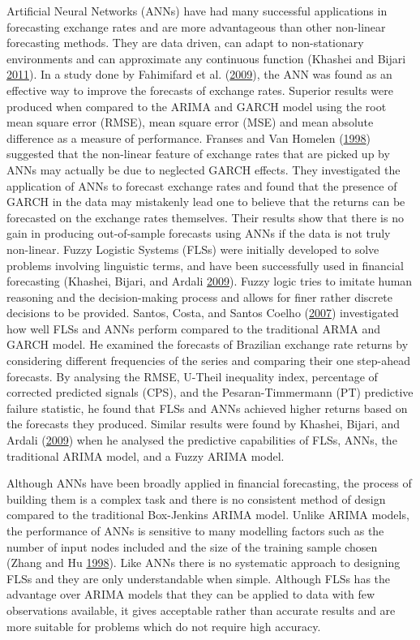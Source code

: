 \documentclass[12pt,preprint, authoryear]{elsarticle}
\numberwithin{equation}{section}
\numberwithin{figure}{section}
\numberwithin{table}{section}
\begin{document}
Artificial Neural Networks (ANNs) have had many successful applications
in forecasting exchange rates and are more advantageous than other
non-linear forecasting methods. They are data driven, can adapt to
non-stationary environments and can approximate any continuous function
(Khashei and Bijari \protect\hyperlink{ref-khashei2011}{2011}). In a
study done by Fahimifard et al.
(\protect\hyperlink{ref-fahimifard2009}{2009}), the ANN was found as an
effective way to improve the forecasts of exchange rates. Superior
results were produced when compared to the ARIMA and GARCH model using
the root mean square error (RMSE), mean square error (MSE) and mean
absolute difference as a measure of performance. Franses and Van Homelen
(\protect\hyperlink{ref-franses1998}{1998}) suggested that the
non-linear feature of exchange rates that are picked up by ANNs may
actually be due to neglected GARCH effects. They investigated the
application of ANNs to forecast exchange rates and found that the
presence of GARCH in the data may mistakenly lead one to believe that
the returns can be forecasted on the exchange rates themselves. Their
results show that there is no gain in producing out-of-sample forecasts
using ANNs if the data is not truly non-linear. Fuzzy Logistic Systems
(FLSs) were initially developed to solve problems involving linguistic
terms, and have been successfully used in financial forecasting
(Khashei, Bijari, and Ardali \protect\hyperlink{ref-khashei2009}{2009}).
Fuzzy logic tries to imitate human reasoning and the decision-making
process and allows for finer rather discrete decisions to be provided.
Santos, Costa, and Santos Coelho
(\protect\hyperlink{ref-santos2007}{2007}) investigated how well FLSs
and ANNs perform compared to the traditional ARMA and GARCH model. He
examined the forecasts of Brazilian exchange rate returns by considering
different frequencies of the series and comparing their one step-ahead
forecasts. By analysing the RMSE, U-Theil inequality index, percentage
of corrected predicted signals (CPS), and the Pesaran-Timmermann (PT)
predictive failure statistic, he found that FLSs and ANNs achieved
higher returns based on the forecasts they produced. Similar results
were found by Khashei, Bijari, and Ardali
(\protect\hyperlink{ref-khashei2009}{2009}) when he analysed the
predictive capabilities of FLSs, ANNs, the traditional ARIMA model, and
a Fuzzy ARIMA model.

Although ANNs have been broadly applied in financial forecasting, the
process of building them is a complex task and there is no consistent
method of design compared to the traditional Box-Jenkins ARIMA model.
Unlike ARIMA models, the performance of ANNs is sensitive to many
modelling factors such as the number of input nodes included and the
size of the training sample chosen (Zhang and Hu
\protect\hyperlink{ref-zhang1998}{1998}). Like ANNs there is no
systematic approach to designing FLSs and they are only understandable
when simple. Although FLSs has the advantage over ARIMA models that they
can be applied to data with few observations available, it gives
acceptable rather than accurate results and are more suitable for
problems which do not require high accuracy.
\end{document}
